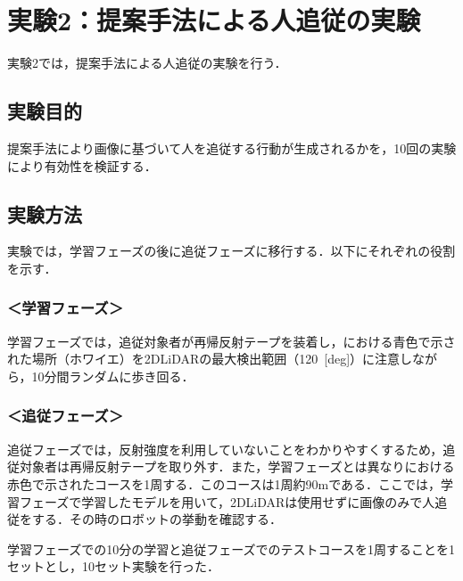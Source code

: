 \section{実験2：提案手法による人追従の実験}

  実験2では，提案手法による人追従の実験を行う．

\subsection{実験目的}

  提案手法により画像に基づいて人を追従する行動が生成されるかを，10回の実験により有効性を検証する．

\subsection{実験方法}

  実験では，学習フェーズの後に追従フェーズに移行する．以下にそれぞれの役割を示す．

  \subsubsection*{＜学習フェーズ＞}
  学習フェーズでは，追従対象者が再帰反射テープを装着し，における青色で示された場所（ホワイエ）を2DLiDARの最大検出範囲（120\, [deg]）に注意しながら，10分間ランダムに歩き回る．

  \subsubsection*{＜追従フェーズ＞}
  追従フェーズでは，反射強度を利用していないことをわかりやすくするため，追従対象者は再帰反射テープを取り外す．また，学習フェーズとは異なりにおける赤色で示されたコースを1周する．このコースは1周約90mである．ここでは，学習フェーズで学習したモデルを用いて，2DLiDARは使用せずに画像のみで人追従をする．その時のロボットの挙動を確認する．

  \vspace{1cm}

  学習フェーズでの10分の学習と追従フェーズでのテストコースを1周することを1セットとし，10セット実験を行った．

\newpage

